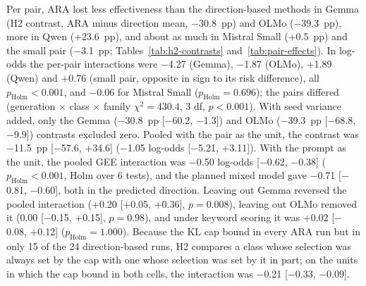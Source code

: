 Per pair, ARA lost less effectiveness than the direction-based methods in
Gemma (H2 contrast, ARA minus direction mean, $-$30.8~pp) and OLMo
($-$39.3~pp), more in Qwen (+23.6~pp), and about as much in Mistral Small
(+0.5~pp) and the small pair ($-$3.1~pp; Tables~\ref{tab:h2-contrasts}
and~\ref{tab:pair-effects}). In log-odds the per-pair interactions were
$-$4.27 (Gemma), $-$1.87 (OLMo), +1.89 (Qwen) and +0.76 (small pair, opposite
in sign to its risk difference), all $p_\mathrm{Holm}<0.001$, and $-$0.06 for
Mistral Small ($p_\mathrm{Holm}=0.696$); the pairs differed (generation
$\times$ class $\times$ family $\chi^2=430.4$, 3 df, $p<0.001$). With seed
variance added, only the Gemma ($-$30.8~pp [$-$60.2, $-$1.3]) and OLMo
($-$39.3~pp [$-$68.8, $-$9.9]) contrasts excluded zero. Pooled with the pair
as the unit, the contrast was $-$11.5~pp [$-$57.6, +34.6] ($-$1.05 log-odds
[$-$5.21, +3.11]). With the prompt as the unit, the pooled GEE interaction was
$-$0.50 log-odds [$-$0.62, $-$0.38] ($p_\mathrm{Holm}<0.001$, Holm over 6
tests), and the planned mixed model gave $-$0.71 [$-$0.81, $-$0.60], both in
the predicted direction. Leaving out Gemma reversed the pooled interaction
(+0.20 [+0.05, +0.36], $p=0.008$), leaving out OLMo removed it (0.00
[$-$0.15, +0.15], $p=0.98$), and under keyword scoring it was +0.02 [$-$0.08,
+0.12] ($p_\mathrm{Holm}=1.000$). Because the KL cap bound in every ARA run
but in only 15 of the 24 direction-based runs, H2 compares a class whose
selection was always set by the cap with one whose selection was set by it in
part; on the units in which the cap bound in both cells, the interaction was
$-$0.21 [$-$0.33, $-$0.09].



